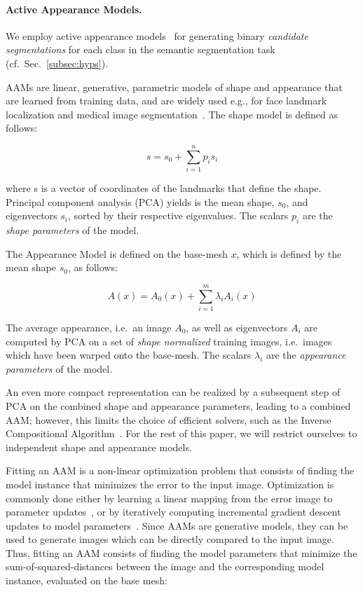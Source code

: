\documentclass[10pt,twocolumn,letterpaper]{article}
\begin{document}
\paragraph{Active Appearance Models. }
We employ active appearance models~\cite{CootesAAM2001} for generating binary \emph{candidate segmentations} for each class in the semantic segmentation task (cf.\ Sec.\ \ref{subsec:hyps}). 

AAMs are linear, generative, parametric models of shape and appearance that are learned from training data, and are widely used e.g., for face landmark localization and medical image segmentation~\cite{Heimann2009543}. 
%
The shape model is defined as follows:

\[s = s_0 + \sum_{i=1}^n p_i s_i\]

where s is a vector of coordinates of the landmarks that define the shape.  Principal component analysis (PCA) yields is the mean shape, $s_0$, and eigenvectors $s_i$, sorted by their respective eigenvalues. The scalars $p_i$ are the \emph{shape parameters} of the model. 

The Appearance Model is defined on the base-mesh  $x$, which is defined by the mean shape $s_0$, as follows:

\[A(x) = A_0(x) + \sum_{i=1}^m \lambda_i A_i(x)\]

The average appearance, i.e.\ an image $A_0$, as well as eigenvectors $A_i$ are computed by PCA on a set of \emph{shape normalized} training images, i.e.\ images which have been warped onto the base-mesh. The scalars $\lambda_i$ are the \emph{appearance parameters} of the model. 

An even more compact representation can be realized by a subsequent step of PCA on the combined shape and appearance parameters, leading to a combined AAM; however, this limits the choice of efficient solvers, such as the Inverse Compositional Algorithm~\cite{BakerAAM2004}. 
For the rest of this paper, we will restrict ourselves to independent shape and appearance models.

Fitting an AAM is a non-linear optimization problem that consists of finding the model instance that minimizes the error to the input image. Optimization is commonly done either by learning a linear mapping from the error image to parameter updates~\cite{CootesAAM2001}, or by iteratively computing incremental gradient descent updates to model parameters~\cite{BakerAAM2004}. 
%
Since AAMs are generative models, they can be used to generate images which can be directly compared to the input image.  Thus, fitting an AAM consists of finding the model parameters that minimize the sum-of-squared-distances between the image and the corresponding model instance, evaluated on the base mesh:
\end{document}
